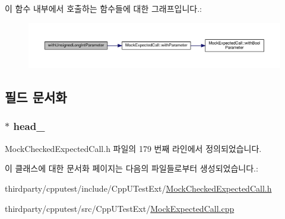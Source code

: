이 함수 내부에서 호출하는 함수들에 대한 그래프입니다.\+:
\nopagebreak
\begin{figure}[H]
\begin{center}
\leavevmode
\includegraphics[width=350pt]{class_mock_expected_call_composite_a7da86441ae351a1a81b1093176fe75cd_cgraph}
\end{center}
\end{figure}




\subsection{필드 문서화}
\subsubsection[{\texorpdfstring{head\+\_\+}{head_}}]{$\ast$ head\+\_\+\hspace{0.3cm}{\ttfamily [private]}}\hypertarget{class_mock_expected_call_composite_ab2cbb66e9c0941965ada23b66f2e3ca1}{}\label{class_mock_expected_call_composite_ab2cbb66e9c0941965ada23b66f2e3ca1}


Mock\+Checked\+Expected\+Call.\+h 파일의 179 번째 라인에서 정의되었습니다.



이 클래스에 대한 문서화 페이지는 다음의 파일들로부터 생성되었습니다.\+:\begin{DoxyCompactItemize}
\item 
thirdparty/cpputest/include/\+Cpp\+U\+Test\+Ext/\hyperlink{_mock_checked_expected_call_8h}{Mock\+Checked\+Expected\+Call.\+h}\item 
thirdparty/cpputest/src/\+Cpp\+U\+Test\+Ext/\hyperlink{_mock_expected_call_8cpp}{Mock\+Expected\+Call.\+cpp}\end{DoxyCompactItemize}
